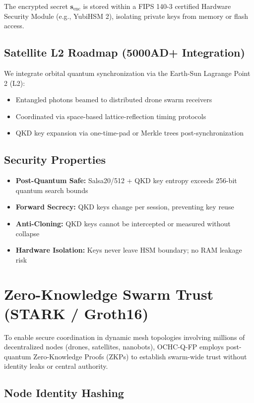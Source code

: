 \documentclass[12pt]{article}
\begin{document}
The encrypted secret \( \mathbf{s}_{\text{enc}} \) is stored within a FIPS 140-3 certified Hardware Security Module (e.g., YubiHSM 2), isolating private keys from memory or flash access.

\subsection*{Satellite L2 Roadmap (5000AD+ Integration)}

We integrate orbital quantum synchronization via the Earth-Sun Lagrange Point 2 (L2):

\begin{itemize}
    \item Entangled photons beamed to distributed drone swarm receivers
    \item Coordinated via space-based lattice-reflection timing protocols
    \item QKD key expansion via one-time-pad or Merkle trees post-synchronization
\end{itemize}

\subsection*{Security Properties}

\begin{itemize}
    \item \textbf{Post-Quantum Safe:} Salsa20/512 + QKD key entropy exceeds 256-bit quantum search bounds
    \item \textbf{Forward Secrecy:} QKD keys change per session, preventing key reuse
    \item \textbf{Anti-Cloning:} QKD keys cannot be intercepted or measured without collapse
    \item \textbf{Hardware Isolation:} Keys never leave HSM boundary; no RAM leakage risk
\end{itemize}
\section*{Zero-Knowledge Swarm Trust (STARK / Groth16)}

To enable secure coordination in dynamic mesh topologies involving millions of decentralized nodes (drones, satellites, nanobots), OCHC-Q-FP employs post-quantum Zero-Knowledge Proofs (ZKPs) to establish swarm-wide trust without identity leaks or central authority.

\subsection*{Node Identity Hashing}
\end{document}
